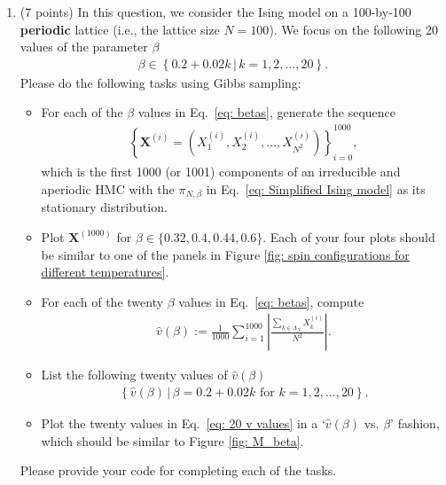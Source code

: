 \documentclass[11pt,letterpaper, leqno]{article}
\numberwithin{equation}{section}
\numberwithin{theorem}{section}
\numberwithin{lemma}{section}
\numberwithin{corollary}{section}
\numberwithin{definition}{section}
\numberwithin{proposition}{section}
\numberwithin{remark}{section}
\numberwithin{example}{section}
\begin{document}
\begin{enumerate}
\item (7 points) In this question, we consider the Ising model on a 100-by-100 \textbf{periodic} lattice (i.e., the lattice size $N=100$). We focus on the following 20 values of the parameter $\beta$
\begin{align}\label{eq: betas}
    \beta \in \left\{0.2 + 0.02k \,\vert\, k=1,2,\ldots,20\right\}.
\end{align}
Please do the following tasks using Gibbs sampling: 
\begin{itemize}
    \item For each of the $\beta$ values in Eq.~\eqref{eq: betas}, generate the sequence
\begin{align}\label{eq: finite sequence}
    \left\{ \boldsymbol{X}^{(i)}=\left( X_1^{(i)}, X_2^{(i)},\ldots, X_{N^2}^{(i)} \right) \right\}_{i=0}^{1000},
\end{align}
which is the first 1000 (or 1001) components of an irreducible and aperiodic HMC with the $\pi_{N,\beta}$ in Eq.~\eqref{eq: Simplified Ising model} as its stationary distribution.

\item Plot $\boldsymbol{X}^{(1000)}$ for $\beta\in\{0.32, 0.4, 0.44, 0.6\}$. Each of your four plots should be similar to one of the panels in Figure \ref{fig: spin configurations for different temperatures}.

\item For each of the twenty $\beta$ values in Eq.~\eqref{eq: betas}, compute 
\begin{align*}
    \widehat{v}(\beta):= \frac{1}{1000}\sum_{i=1}^{1000} \left\vert\frac{\sum_{k\in\Lambda_N} X^{(i)}_k}{N^2}\right\vert.
\end{align*}

\item List the following twenty values of $\widehat{v}(\beta)$
\begin{align}\label{eq: 20 v values}
    \left\{ \widehat{v}(\beta) \,\Big\vert\, \beta=0.2 + 0.02k \text{ for } k=1,2,\ldots,20\right\}.
\end{align}

\item Plot the twenty values in Eq.~\eqref{eq: 20 v values} in a `$\widehat{v}(\beta)$ vs. $\beta$' fashion, which should be similar to Figure \ref{fig: M_beta}.

\end{itemize}

Please provide your code for completing each of the tasks.
\end{enumerate}
\end{document}
